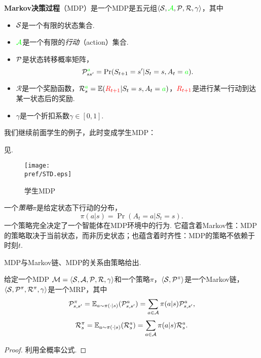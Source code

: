 \begin{definition}
\textbf{Markov决策过程}（MDP）是一个MDP是五元组$\langle\MS, \textcolor{green}{\mathcal A}, \P, \mathcal R, \gamma\rangle$，其中
\begin{itemize}
    \item $\MS$是一个有限的状态集合.
    \item $\textcolor{green}{\mathcal A}$是一个有限的\emph{行动}（action）集合.
    \item $\P$是状态转移概率矩阵，
    \[\P_{ss'}^{\textcolor{green}{a}} = \Pr(S_{t+1} = s' | S_t = s, A_t = \textcolor{green}{a}).\]
    \item $\mathcal R$是一个奖励函数，$\mathcal R_s^{\textcolor{green}{a}} = \E(\textcolor{red}{R_{t+1}} | S_t = s, A_t = \textcolor{green}{a})$，$\textcolor{red}{R_{t+1}}$是进行某一行动到达某一状态后的奖励.
    \item $\gamma$是一个折扣系数$\gamma\in[0,1]$.
\end{itemize}
\end{definition}


我们继续前面学生的例子，此时变成学生MDP：
\begin{example}[学生MDP]
见.
\begin{figure}
    \centering
    \texttt{[image: \\pref/STD.eps]}
    \caption{学生MDP}
    \label{fig:studentMDP}
\end{figure}
\end{example}

一个\emph{策略}$\pi$是给定状态下行动的分布，
    \[\pi(a|s) = \Pr(A_t=a | S_t = s).\]
一个策略完全决定了一个智能体在MDP环境中的行为. 它蕴含着Markov性：MDP的策略取决于当前状态，而非历史状态；也蕴含着时齐性：MDP的策略不依赖于时刻$t$.

MDP与Markov链、MDP的关系由策略给出. 
\begin{proposition}
给定一个MDP $\M=\langle\MS,\mathcal A,\P,\mathcal R, \gamma\rangle$和一个策略$\pi$，$\langle \MS, \P^{\pi}\rangle$是一个Markov链，$\langle\MS,\P^{\pi}, \mathcal R^{\pi}, \gamma\rangle$是一个MRP，其中
\[\P_{s,s'}^{\pi} = \E_{a\sim\pi(\cdot|s)}(\P^a_{s,s'})=\sum_{a\in \mathcal A}\pi(a|s)\mathcal P_{s,s'}^{a},\]
    \[\mathcal R_s^{\pi} =\E_{a\sim\pi(\cdot|s)}(\mathcal R^a_s)=\sum_{a\in\mathcal A}\pi(a|s)\mathcal R_s^a.\]
\end{proposition}
\begin{proof}
利用全概率公式. 
\end{proof}

